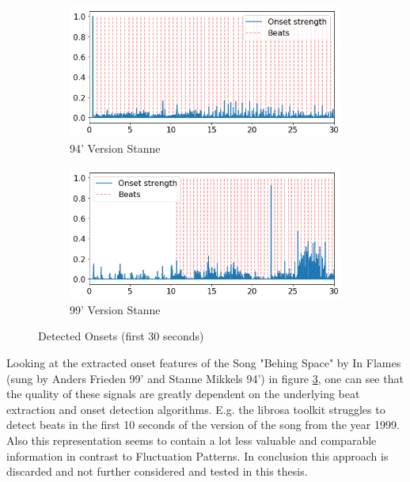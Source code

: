 \begin{figure}[htbp]
{{			\begin{subfigure}{.495\textwidth}
				\centering    
				\includegraphics[scale=0.3]{Images/Beat/s_s_on.png}
				\caption{94' Version Stanne}
				\label{saon}
			\end{subfigure}		
			\begin{subfigure}{.495\textwidth}
				\centering     
				\includegraphics[scale=0.3]{Images/Beat/s_a_on.png}
				\caption{99' Version Stanne}
				\label{sson}
			\end{subfigure}%
				
	}}
	\caption{Detected Onsets (first 30 seconds)}
	\label{fig:ons1}
\end{figure}	

\noindent Looking at the extracted onset features of the Song "Behing Space" by In Flames (sung by Anders Frieden 99' and Stanne Mikkels 94') in figure \ref{fig:ons1}, one can see that the quality of these signals are greatly dependent on the underlying beat extraction and onset detection algorithms. E.g. the librosa toolkit struggles to detect beats in the first 10 seconds of the version of the song from the year 1999. Also this representation seems to contain a lot less valuable and comparable information in contrast to Fluctuation Patterns. 
In conclusion this approach is discarded and not further considered and tested in this thesis.  

